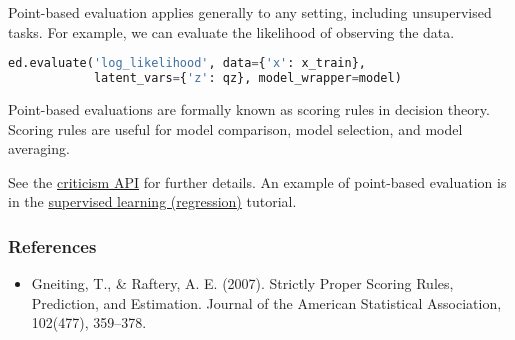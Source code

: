 Point-based evaluation applies generally to any setting, including
unsupervised tasks. For example, we can evaluate the likelihood of
observing the data.
\begin{lstlisting}[language=Python]
ed.evaluate('log_likelihood', data={'x': x_train},
            latent_vars={'z': qz}, model_wrapper=model)
\end{lstlisting}

Point-based evaluations are formally known as scoring rules
in decision theory. Scoring rules are useful for model comparison, model
selection, and model averaging.

See the \href{api/criticisms.html}{criticism API} for further details.
An example of point-based evaluation is in the
\href{tut_supervised_regression.html}{supervised learning
(regression)} tutorial.

\subsubsection{References}\label{references}

\begin{itemize}
\item
  Gneiting, T., & Raftery, A. E. (2007). Strictly Proper Scoring
  Rules, Prediction, and Estimation. Journal of the American
  Statistical Association, 102(477), 359–378.
\end{itemize}
